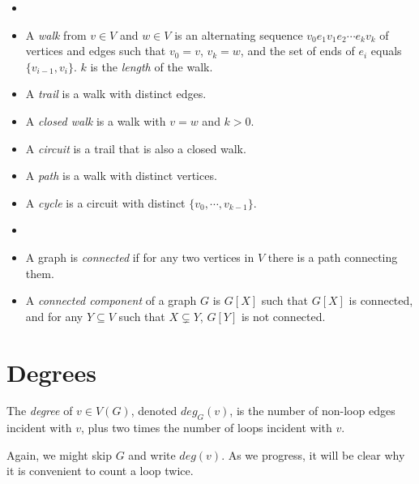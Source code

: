         \begin{defn} \label{def_graph_path} \begin{itemize}
            \item[]
            \item A \emph{walk} from $v \in V$ and $w \in V$ is an alternating sequence $v_0 e_1 v_1 e_2 \cdots e_k v_k$ of vertices and edges such that $v_0 = v$, $v_k = w$, and the set of ends of $e_i$ equals $\{v_{i-1}, v_i\}$. $k$ is the \emph{length} of the walk.
            \item A \emph{trail} is a walk with distinct edges.
            \item A \emph{closed walk} is a walk with $v=w$ and $k>0$.
            \item A \emph{circuit} is a trail that is also a closed walk.
            \item A \emph{path} is a walk with distinct vertices.
            \item A \emph{cycle} is a circuit with distinct $\{v_0, \cdots, v_{k-1}\}$.
        \end{itemize} \end{defn}
        
        \begin{defn}[Connectivity] \label{def_connected_graph} \begin{itemize}
            \item []
            \item A graph is \emph{connected} if for any two vertices in $V$ there is a path connecting them.
            \item A \emph{connected component} of a graph $G$ is $G[X]$ such that $G[X]$ is connected, and for any $Y \subseteq V$ such that $X \subsetneq Y$, $G[Y]$ is not connected.
        \end{itemize} \end{defn}
    
    \section{Degrees}
    
        \begin{defn}[Degree] \label{def_graph_degree}
            The \emph{degree} of $v \in V(G)$, denoted $deg_G(v)$, is the number of non-loop edges incident with $v$, plus two times the number of loops incident with $v$.
        \end{defn}
        
        Again, we might skip $G$ and write $deg(v)$. As we progress, it will be clear why it is convenient to count a loop twice.
        
